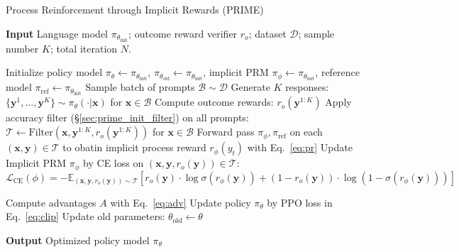\begin{algorithm}

\caption{Process Reinforcement through Implicit Rewards (PRIME)}
\textbf{Input} Language model $\pi_{\theta_{\text{init}}}$; outcome reward verifier $r_o$; dataset $\mathcal{D}$; sample number $K$; total iteration $N$.

\begin{algorithmic}[1]
\State Initialize policy model $\pi_\theta \leftarrow \pi_{\theta_{\text{init}}}$, $\pi_{\theta_{\text{old}}} \leftarrow \pi_{\theta_{\text{init}}}$, implicit PRM $\pi_{\phi} \leftarrow \pi_{\theta_{\text{init}}}$, reference model $\pi_{\text{ref}} \leftarrow \pi_{\theta_{\text{init}}}$
    \State Sample batch of prompts $\mathcal{B} \sim \mathcal{D}$
        \State Generate $K$ responses: $\{\mathbf{y}^1, ..., \mathbf{y}^K\} \sim \pi_\theta(\cdot|\mathbf{x})$ for $\mathbf{x} \in \mathcal{B}$
        \State Compute outcome rewards: $r_o\left(\mathbf{y}^{1:K}\right)$
        \State Apply accuracy filter (\S \ref{sec:prime_init_filter}) on all prompts: $\mathcal{T} \leftarrow \text{Filter}(\mathbf{x}, \mathbf{y}^{1:K}, r_o\left(\mathbf{y}^{1:K}\right))$ for $\mathbf{x} \in \mathcal{B}$
        \State Forward pass $\pi_\phi, \pi_\text{ref}$ on each $(\mathbf{x}, \mathbf{y}) \in \mathcal{T}$ to obatin implicit process reward $r_\phi(y_t)$ with Eq.~\ref{eq:pr} 
        \State Update Implicit PRM $\pi_\phi$ by CE loss on $(\mathbf{x}, \mathbf{y}, r_o\left(\mathbf{y}\right)) \in \mathcal{T}$:
            \[
            \mathcal{L}_{\text{CE}}(\phi) = -\mathbb{E}_{\left(\mathbf{x},\mathbf{y},r_o\left(\mathbf{y}\right)\right)\sim\mathcal{T}} \left[ r_o\left(\mathbf{y}\right) \cdot \log \sigma \left( r_\phi \left(\mathbf{y}\right) \right) + (1-r_o\left(\mathbf{y}\right)) \cdot \log\left( 1 - \sigma \left( r_\phi \left(\mathbf{y}\right) \right) \right) \right]
            \]

        \State Compute advantages $A$ with Eq.~\ref{eq:adv} %
        \State Update policy $\pi_\theta$ by PPO loss in Eq.~\ref{eq:clip}
    \State Update old parameters: $\theta_{\text{old}} \leftarrow \theta$%

\EndFor
\end{algorithmic}
\textbf{Output} Optimized policy model $\pi_\theta$

\label{algo:prime}
\end{algorithm}